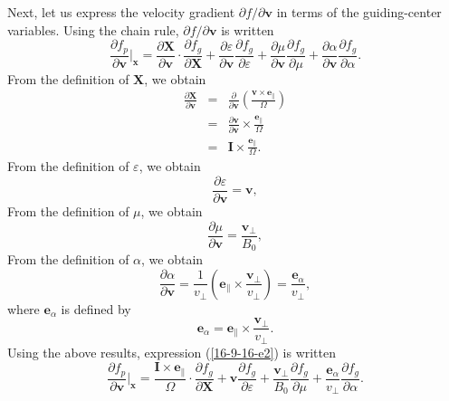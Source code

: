 \documentclass{article}
\newcommand{\nobracket}{}
\newcommand{\tmmathbf}[1]{\ensuremath{\boldsymbol{#1}}}
\begin{document}
Next, let us express the velocity gradient $\partial f / \partial \mathbf{v}$
in terms of the guiding-center variables. Using the chain rule, $\partial f /
\partial \mathbf{v}$ is written
\begin{equation}
  \label{16-9-16-e2} \frac{\partial f_p}{\partial \mathbf{v}} |_{\mathbf{x}}
  \nobracket = \frac{\partial \mathbf{X}}{\partial \mathbf{v}} \cdot
  \frac{\partial f_g}{\partial \mathbf{X}} + \frac{\partial
  \varepsilon}{\partial \mathbf{v}}  \frac{\partial f_g}{\partial \varepsilon}
  + \frac{\partial \mu}{\partial \mathbf{v}}  \frac{\partial f_g}{\partial
  \mu} + \frac{\partial \alpha}{\partial \mathbf{v}}  \frac{\partial
  f_g}{\partial \alpha} .
\end{equation}
From the definition of $\mathbf{X}$, we obtain
\begin{eqnarray}
  \frac{\partial \mathbf{X}}{\partial \mathbf{v}} & = &
  \frac{\partial}{\partial \mathbf{v}} \left( \frac{\tmmathbf{v} \times
  \tmmathbf{e}_{\parallel}}{\Omega} \right) \nonumber\\
  & = &  \frac{\partial \mathbf{v}}{\partial \mathbf{v}} \times
  \frac{\tmmathbf{e}_{\parallel}}{\Omega} \nonumber\\
  & = & \mathbf{I} \times \frac{\tmmathbf{e}_{\parallel}}{\Omega} . 
\end{eqnarray}
From the definition of $\varepsilon$, we obtain
\begin{equation}
  \frac{\partial \varepsilon}{\partial \mathbf{v}} =\mathbf{v},
\end{equation}
From the definition of $\mu$, we obtain
\begin{equation}
  \frac{\partial \mu}{\partial \mathbf{v}} = \frac{\mathbf{v}_{\perp}}{B_0},
\end{equation}
From the definition of $\alpha$, we obtain
\begin{equation}
  \frac{\partial \alpha}{\partial \mathbf{v}} = \frac{1}{v_{\perp}} \left(
  \tmmathbf{e}_{\parallel} \times \frac{\mathbf{v}_{\perp}}{v_{\perp}} \right)
  = \frac{\tmmathbf{e}_{\alpha}}{v_{\perp}},
\end{equation}
where $\mathbf{e}_{\alpha}$ is defined by
\begin{equation}
  \tmmathbf{e}_{\alpha} = \tmmathbf{e}_{\parallel} \times
  \frac{\mathbf{v}_{\perp}}{v_{\perp}} .
\end{equation}
Using the above results, expression (\ref{16-9-16-e2}) is written
\begin{equation}
  \frac{\partial f_p}{\partial \mathbf{v}} |_{\mathbf{x}} \nobracket =
  \frac{\mathbf{I} \times \tmmathbf{e}_{\parallel}}{\Omega} \cdot
  \frac{\partial f_g}{\partial \mathbf{X}} +\mathbf{v} \frac{\partial
  f_g}{\partial \varepsilon} + \frac{\mathbf{v}_{\perp}}{B_0} \frac{\partial
  f_g}{\partial \mu} + \frac{\tmmathbf{e}_{\alpha}}{v_{\perp}}  \frac{\partial
  f_g}{\partial \alpha} .
\end{equation}
\end{document}
